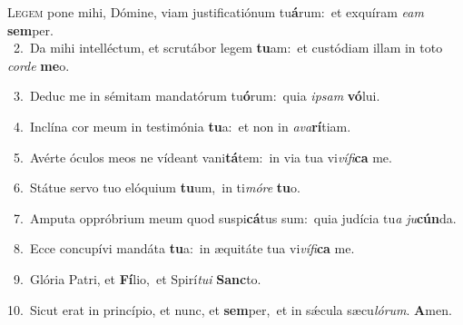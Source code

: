 \lettrine{\initial\textcolor{\initialcolor}{L}}{egem} pone mihi, Dómine, viam justificatiónum tu\-\textbf{á}\-rum:~\star et exquíram \textit{e}\-\textit{am} \textbf{sem}\-per.\\
{\numbfont\textcolor{\numbcolor}{~2.}}~Da mihi intelléctum, et scrutábor legem \textbf{tu}\-am:~\star et custódiam illam in toto \textit{cor}\-\textit{de} \textbf{me}\-o.\par
{\numbfont\textcolor{\numbcolor}{~3.}}~Deduc me in sémitam mandatórum tu\-\textbf{ó}\-rum:~\star quia \textit{ip}\-\textit{sam} \textbf{vó}\-lui.\par
{\numbfont\textcolor{\numbcolor}{~4.}}~Inclína cor meum in testimónia \textbf{tu}\-a:~\star et non in \textit{a}\-\textit{va}\textbf{rí}tiam.\par
{\numbfont\textcolor{\numbcolor}{~5.}}~Avérte óculos meos ne vídeant vani\-\textbf{tá}\-tem:~\star in via tua vi\-\textit{ví}\-\textit{fi}\textbf{ca} me.\par
{\numbfont\textcolor{\numbcolor}{~6.}}~Státue servo tuo elóquium \textbf{tu}\-um,~\star in ti\-\textit{mó}\-\textit{re} \textbf{tu}\-o.\par
{\numbfont\textcolor{\numbcolor}{~7.}}~Amputa oppróbrium meum quod suspi\-\textbf{cá}\-tus sum:~\star quia judícia tu\textit{a} \textit{ju}\-\textbf{cún}da.\par
{\numbfont\textcolor{\numbcolor}{~8.}}~Ecce concupívi mandáta \textbf{tu}\-a:~\star in æquitáte tua vi\-\textit{ví}\-\textit{fi}\textbf{ca} me.\par
{\numbfont\textcolor{\numbcolor}{~9.}}~Glória Patri, et \textbf{Fí}\-lio,~\star et Spirí\-\textit{tu}\-\textit{i} \textbf{Sanc}\-to.\par
{\numbfont\textcolor{\numbcolor}{10.}}~Sicut erat in princípio, et nunc, et \textbf{sem}\-per,~\star et in sǽcula sæcu\-\textit{ló}\-\textit{rum}. \textbf{A}\-men.\par

